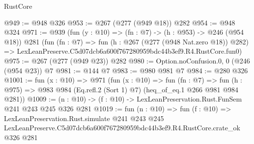 \begin{lexlean}{RustCore}
\begin{coremodule}
@949 := @948 @326
@953 := @267 (@277 (@949 @18)) @282
@954 := @948 @324
@971 := @939
    (fun (y : @10) => (fn : @7) -> (h : @953) -> @246 (@954 @18))
    @281
    (fun (fn : @7) =>
    fun (h : @267 (@277 (@948 Nat.zero @18)) @282) =>
    LexLeanPreserve.C5d07dcb6a600f767280959bdc44b3ef9.R4.RustCore.fun0)
@975 := @267 (@277 (@949 @23)) @282
@980 := Option.noConfusion.{0, 0} (@246 (@954 @23)) @7
@981 := @144 @7
@983 := @980 @981 @7
@984 := @280 @326
@1001 := fun (x : @10) =>
  @971
    (fun (x : @10) =>
    fun (fn : @7) =>
    fun (h : @975) => @983 @984 (Eq.refl.{2} (Sort 1) @7) (heq_of_eq.{1} @266 @981 @984 @281))
@1009 := (n : @10) -> (f : @10) -> LexLeanPreservation.Rust.FunSem @241 @243 @245 @326 @281
@1019 := fun (n : @10) =>
  fun (f : @10) =>
  LexLeanPreservation.Rust.simulate
    @241
    @243
    @245
    LexLeanPreserve.C5d07dcb6a600f767280959bdc44b3ef9.R4.RustCore.crate_ok
    @326
    @281
\end{coremodule}
\end{lexlean}
